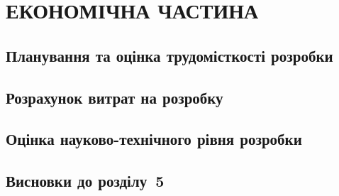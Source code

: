 \section{ЕКОНОМІЧНА ЧАСТИНА}


\subsection{Планування та оцінка трудомісткості розробки}

\subsection{Розрахунок витрат на розробку}

\subsection{Оцінка науково-технічного рівня розробки}

\subsection*{Висновки до розділу~5}
